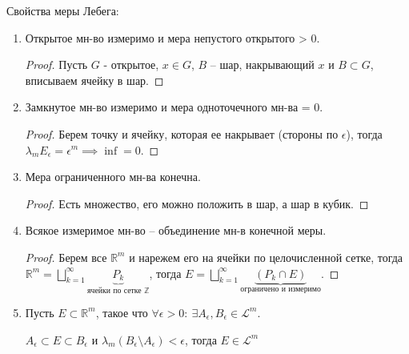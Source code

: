 \begin{properties}
    Свойства меры Лебега:

    \begin{enumerate}
        \item {
            Открытое мн-во измеримо и мера непустого открытого > 0.

            \begin{proof}
                Пусть $G$ - открытое, $x \in G$, $B$ -- шар, накрывающий $x$ и $B \subset G$, вписываем ячейку в шар.
            \end{proof}
        }
        \item {
            Замкнутое мн-во измеримо и мера одноточечного мн-ва = 0.

            \begin{proof}
                Берем точку и ячейку, которая ее накрывает (стороны по $\epsilon$), тогда $\lambda_m E_{\epsilon} = \epsilon^m \implies \inf = 0$.
            \end{proof}
        }
        \item {
            Мера ограниченного мн-ва конечна.

            \begin{proof}
                Есть множество, его можно положить в шар, а шар в кубик.

            \end{proof}
        }
        \item {
            Всякое измеримое мн-во -- объединение мн-в конечной меры.

            \begin{proof}
                Берем все $\mathbb{R}^m$ и нарежем его на ячейки по целочисленной сетке, тогда $\mathbb{R}^m = \bigsqcup_{k=1}^{\infty} \underbrace{P_k}_{\text{ячейки по сетке $\mathbb{Z}$}}$, тогда $E = \bigsqcup_{k=1}^{\infty}\underbrace{(P_k \cap E)}_{\text{ограничено и измеримо}}$.
            \end{proof}
        }
        \item {
            Пусть $E \subset \mathbb{R}^m$, такое что $\forall \epsilon > 0: \ \exists A_{\epsilon}, B_{\epsilon} \in \mathscr{L}^m$.
            
            $A_{\epsilon} \subset E \subset B_{\epsilon}$ и $\lambda_m (B_{\epsilon} \setminus A_{\epsilon}) < \epsilon$, тогда $E \in \mathscr{L}^m$
            
}
\end{enumerate}
\end{properties}
